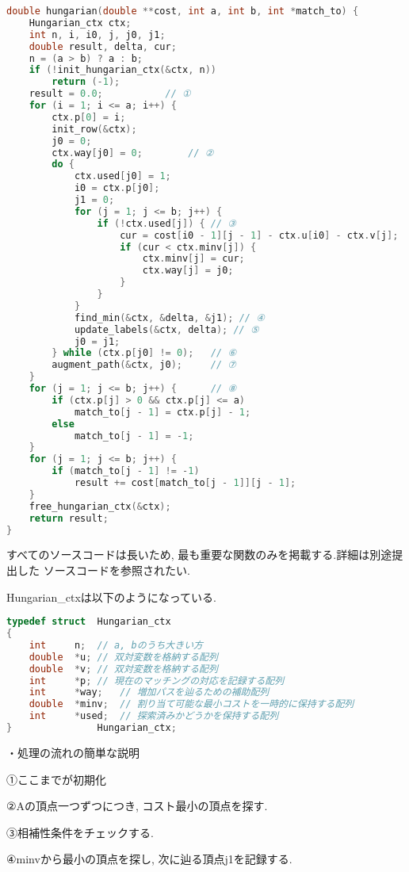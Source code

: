 \documentclass[a4paper]{ltjsarticle}
\begin{document}
\begin{lstlisting}[language=C]
double hungarian(double **cost, int a, int b, int *match_to) {
    Hungarian_ctx ctx;
    int n, i, i0, j, j0, j1;
    double result, delta, cur;
    n = (a > b) ? a : b;
    if (!init_hungarian_ctx(&ctx, n))
        return (-1);
    result = 0.0;			// ①
    for (i = 1; i <= a; i++) {
        ctx.p[0] = i;
        init_row(&ctx);
        j0 = 0;
        ctx.way[j0] = 0;		// ②
        do {
            ctx.used[j0] = 1;
            i0 = ctx.p[j0];
            j1 = 0;
            for (j = 1; j <= b; j++) {
                if (!ctx.used[j]) {	// ③
                    cur = cost[i0 - 1][j - 1] - ctx.u[i0] - ctx.v[j];
                    if (cur < ctx.minv[j]) {
                        ctx.minv[j] = cur;
                        ctx.way[j] = j0;
                    }
                }
            }
            find_min(&ctx, &delta, &j1); // ④
            update_labels(&ctx, delta); // ⑤
            j0 = j1;
        } while (ctx.p[j0] != 0); 	// ⑥
        augment_path(&ctx, j0); 	// ⑦
    }
    for (j = 1; j <= b; j++) {		// ⑧
        if (ctx.p[j] > 0 && ctx.p[j] <= a)
            match_to[j - 1] = ctx.p[j] - 1;
        else
            match_to[j - 1] = -1;
    }
    for (j = 1; j <= b; j++) {
        if (match_to[j - 1] != -1)
            result += cost[match_to[j - 1]][j - 1];
    }
    free_hungarian_ctx(&ctx);
    return result;
}
\end{lstlisting}

すべてのソースコードは長いため, 最も重要な関数のみを掲載する.詳細は別途提出した
ソースコードを参照されたい.

Hungarian\_ctxは以下のようになっている.

\begin{lstlisting}[language=C]
typedef struct 	Hungarian_ctx
{
	int 	n;	// a, bのうち大きい方
	double 	*u;	// 双対変数を格納する配列
	double 	*v;	// 双対変数を格納する配列
	int 	*p;	// 現在のマッチングの対応を記録する配列
	int 	*way;	// 増加パスを辿るための補助配列
	double 	*minv;	// 割り当て可能な最小コストを一時的に保持する配列
	int 	*used;	// 探索済みかどうかを保持する配列
}				Hungarian_ctx;
\end{lstlisting}

・処理の流れの簡単な説明

①ここまでが初期化

②Aの頂点一つずつにつき, コスト最小の頂点を探す.

③相補性条件をチェックする.

④minvから最小の頂点を探し, 次に辿る頂点j1を記録する.
\end{document}
